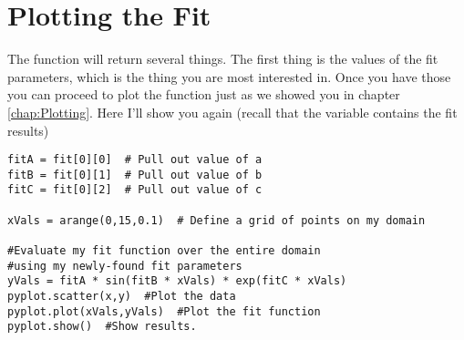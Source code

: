 \section{Plotting the Fit}
The function  will return several things.  The
first thing is the values of the fit parameters, which is the thing
you are most interested in.  Once you have those you can proceed to
plot the function just as we showed you in chapter \ref{chap:Plotting}.
Here I'll show you again (recall that the variable 
contains the fit results)
\begin{Verbatim}
fitA = fit[0][0]  # Pull out value of a
fitB = fit[0][1]  # Pull out value of b
fitC = fit[0][2]  # Pull out value of c

xVals = arange(0,15,0.1)  # Define a grid of points on my domain

#Evaluate my fit function over the entire domain
#using my newly-found fit parameters
yVals = fitA * sin(fitB * xVals) * exp(fitC * xVals)
pyplot.scatter(x,y)  #Plot the data
pyplot.plot(xVals,yVals)  #Plot the fit function
pyplot.show()  #Show results.
\end{Verbatim}
